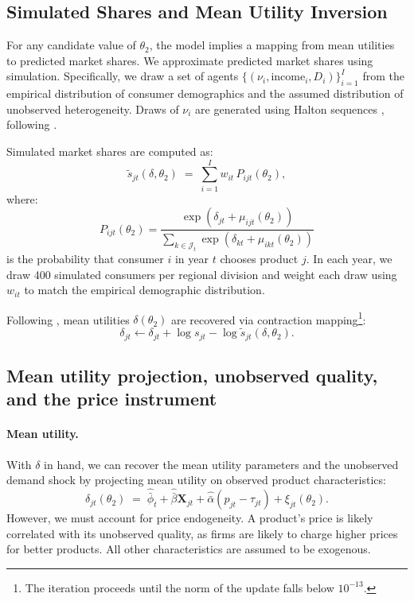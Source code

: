 \documentclass[11pt]{article}
\begin{document}
\subsection{Simulated Shares and Mean Utility Inversion}
For any candidate value of \(\theta_2\), the model implies a mapping from mean utilities to predicted market shares. We approximate predicted market shares using simulation. Specifically, we draw a set of agents
\(\{(\nu_i, \text{income}_i, D_i)\}_{i=1}^I\)
from the empirical distribution of consumer demographics and the assumed distribution of unobserved heterogeneity. Draws of \(\nu_i\) are generated using Halton sequences \citep{halton_efficiency_1960}, following \cite{nevo_measuring_2001}.

Simulated market shares are computed as:
\begin{equation}
\tilde{s}_{jt}(\delta, \theta_2) \;=\; \sum_{i=1}^I w_{it} \, P_{ijt}(\theta_2),
\end{equation}
where:
\begin{equation}\label{eq:choice_prob}
P_{ijt}(\theta_2)
=
\frac{\exp\!\left(\delta_{jt} + \mu_{ijt}(\theta_2)\right)}
{\sum_{k \in \mathcal{J}_t} \exp\!\left(\delta_{kt} + \mu_{ikt}(\theta_2)\right)}
\end{equation}
is the probability that consumer \(i\) in year \(t\) chooses product \(j\). In each year, we draw 400 simulated consumers per regional division and weight each draw using \(w_{it}\) to match the empirical demographic distribution.

Following \cite{berry_automobile_1995}, mean utilities \(\delta(\theta_2)\) are recovered via contraction mapping\footnote{The iteration proceeds until the norm of the update falls below \(10^{-13}\).}:
\begin{equation}
\delta_{jt}
\leftarrow
\delta_{jt} + \log s_{jt} - \log \tilde{s}_{jt}(\delta, \theta_2).
\end{equation}


\subsection{Mean utility projection, unobserved quality, and the price instrument}
\paragraph{Mean utility.}
With $\delta$ in hand, we can recover the mean utility parameters and the unobserved demand shock by projecting mean utility on observed product characteristics:
\begin{equation}\label{eq:projection}
\delta_{jt}(\theta_2) \;=\; \hat{\bar{\phi}}_t + \hat{\bar{\beta}} \mathbf{X}_{jt} + \hat{\bar{\alpha}}(p_{jt}-\tau_{jt}) + \xi_{jt}(\theta_2).
\end{equation}
However, we must account for price endogeneity. A product's price is likely correlated with its unobserved quality, as firms are likely to charge higher prices for better products. All other characteristics are assumed to be exogenous.
\end{document}
